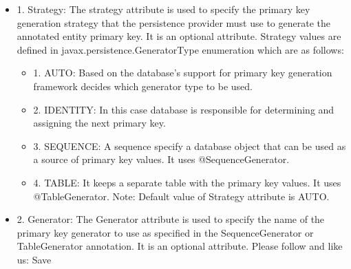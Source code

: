 \documentclass{report}
\begin{document}
\begin{itemize}
\begin{itemize}
					\item 1. Strategy:
					The strategy attribute is used to specify the primary key generation strategy that the persistence provider must use to generate the annotated entity primary key. It is an optional attribute. Strategy values are defined in javax.persistence.GeneratorType enumeration which are as follows:
					\begin{itemize}
						\item 1. AUTO: Based on the database’s support for primary key generation framework decides which generator type to be used.
						\item 2. IDENTITY: In this case database is responsible for determining and assigning the next primary key.
						\item 3. SEQUENCE: A sequence specify a database object that can be used as a source of primary key values. It uses @SequenceGenerator.
						\item 4. TABLE: It keeps a separate table with the primary key values. It uses @TableGenerator.
						Note: Default value of Strategy attribute is AUTO.
						
					\end{itemize}
					\item 2. Generator:
					The Generator attribute is used to specify the name of the primary key generator to use as specified in the SequenceGenerator or TableGenerator annotation. It is an optional attribute.
					Please follow and like us:
					Save
				\end{itemize}
	\end{itemize}
\end{document}
